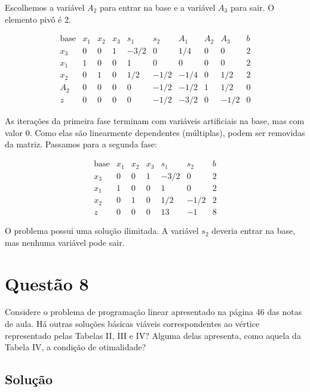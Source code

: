 \documentclass{article}
\begin{document}
Escolhemos a variável $A_2$ para entrar na base e a variável $A_3$ para sair. O elemento pivô é 2.

\[
  \begin{array}{c|cccccccc|c}
    \text{base} & x_1 & x_2 & x_3 & s_1 & s_2 & A_1 & A_2 & A_3 &  b \\ \hline
            x_3 &   0 &   0 &   1 &-3/2 &   0 & 1/4 &   0 &   0 &  2 \\
            x_1 &   1 &   0 &   0 &   1 &   0 &   0 &   0 &   0 &  2 \\
            x_2 &   0 &   1 &   0 & 1/2 &-1/2 &-1/4 &   0 & 1/2 &  2 \\
            A_2 &   0 &   0 &   0 &   0 &-1/2 &-1/2 &   1 & 1/2 &  0 \\ \hline
              z &   0 &   0 &   0 &   0 &-1/2 &-3/2 &   0 &-1/2 &  0
  \end{array}
\]

As iterações da primeira fase terminam com variáveis artificiais na base, mas com valor 0.
Como elas são linearmente dependentes (múltiplas), podem ser removidas da matriz.
Passamos para a segunda fase:


\[
  \begin{array}{c|cccccccc|c}
    \text{base} & x_1 & x_2 & x_3 & s_1 &  s_2 & b \\ \hline
            x_3 &   0 &   0 &   1 &-3/2 &    0 & 2 \\
            x_1 &   1 &   0 &   0 &   1 &    0 & 2 \\
            x_2 &   0 &   1 &   0 & 1/2 & -1/2 & 2 \\ \hline
              z &   0 &   0 &   0 &  13 &   -1 & 8
  \end{array}
\]

O problema possui uma solução ilimitada.
A variável $s_2$ deveria entrar na base, mas nenhuma variável pode sair.


\section{Questão 8}

Considere o problema de programação linear apresentado na página 46 das notas de aula.
Há outras soluções básicas viáveis correspondentes ao vértice representado pelas Tabelas II, III e IV? 
Alguma delas apresenta, como aquela da Tabela IV, a condição de otimalidade?

\subsection{Solução}
\end{document}
